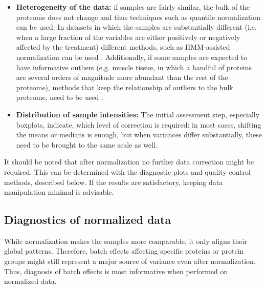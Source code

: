 \documentclass[num-refs]{wiley-article}
\begin{document}
\begin{itemize}
    \item \textbf{Heterogeneity of the data: }if samples are fairly similar, the bulk of the proteome does not change and thus techniques such as quantile normalization \cite{Bolstad2003} can be used. In datasets in which the samples are substantially different (i.e. when a large fraction of the variables are either positively or negatively affected by the treatment) different methods, such as HMM-assisted normalization can be used \cite{Landfors2011}. Additionally, if some samples are expected to have informative outliers (e.g. muscle tissue, in which a handful of proteins are several orders of magnitude more abundant than the rest of the proteome), methods that keep the relationship of outliers to the bulk proteome, need to be used \cite{Wang770115}.

    \item \textbf{Distribution of sample intensities: }The initial assessment step, especially boxplots, indicate, which level of correction is required: in most cases, shifting the means or medians is enough, but when variances differ substantially, these need to be brought to the same scale as well.
\end{itemize}
It should be noted that after normalization no further data correction might be required. This can be determined with the diagnostic plots and quality control methods, described below. If the results are satisfactory, keeping data manipulation minimal is advisable.

\subsection{Diagnostics of normalized data}
While normalization makes the samples more comparable, it only aligns their global patterns. Therefore, batch effects affecting specific proteins or protein groups might still represent a major source of variance even after normalization. Thus, diagnosis of batch effects is most informative when performed on normalized data. 
\end{document}
